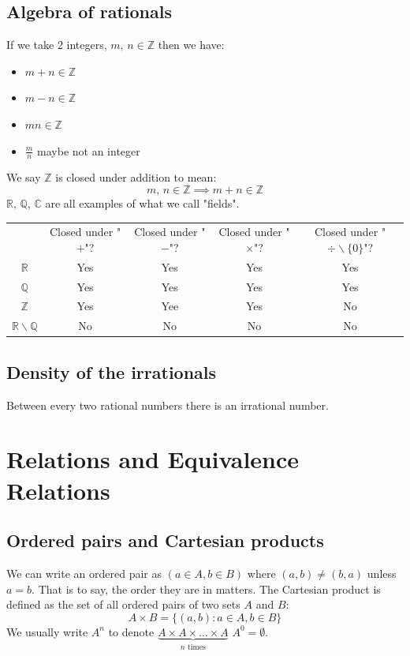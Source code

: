 \documentclass[12pt]{article}
\newcommand{\integer}{\in\mathbb{Z}}
\begin{document}
\subsection*{Algebra of rationals}
If we take 2 integers, \(m,\,n\integer\) then we have:
\begin{itemize}
    \item \(m+n\integer\)
    \item \(m-n\integer\)
    \item \(mn\integer\)
    \item \(\frac{m}{n}\) maybe not an integer
\end{itemize}
We say \(\mathbb{Z}\) is closed under addition to mean:
\[m,\,n\integer\implies m+n\integer\]
\(\mathbb{R},\,\mathbb{Q},\,\mathbb{C}\) are all examples of what we call "fields".
\begin{table}[h]
    \begin{tabular}{c c|c|c|c}
        & Closed under "\(+\)"? & Closed under "\(-\)"? & Closed under "\(\times\)"? & Closed under "\(\div\backslash \{0\}\)"? \\
       \(\mathbb{R}\) & Yes & Yes & Yes & Yes \\
       \(\mathbb{Q}\) & Yes & Yes & Yes & Yes \\
       \(\mathbb{Z}\) & Yes & Yee & Yes & No \\
       \(\mathbb{R}\backslash\mathbb{Q}\) & No & No & No & No
    \end{tabular}
\end{table}
\subsection*{Density of the irrationals}
Between every two rational numbers there is an irrational number.
\section{Relations and Equivalence Relations}
\subsection*{Ordered pairs and Cartesian products}
We can write an ordered pair as \((a\in A,b\in B)\) where \((a,b)\ne(b,a)\) unless \(a=b\). That is to say, the order they are in matters. The Cartesian product is defined as the set of all ordered pairs of two sets \(A\) and \(B\):
\[A\times B=\{(a,b): a\in A,b\in B\}\]
We usually write \(A^n\) to denote \(\underbrace{A\times A\times\dots\times A}_{n\text{ times}}\) \(A^0=\emptyset\).
\end{document}

